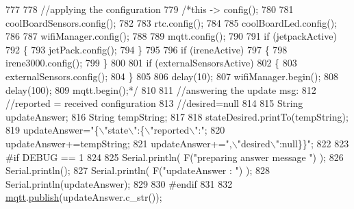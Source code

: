 \begin{DoxyCode}
777 
778             \textcolor{comment}{//applying the configuration    }
779             \textcolor{comment}{/*this -> config();}
780 \textcolor{comment}{}
781 \textcolor{comment}{            coolBoardSensors.config();}
782 \textcolor{comment}{}
783 \textcolor{comment}{            rtc.config();}
784 \textcolor{comment}{}
785 \textcolor{comment}{            coolBoardLed.config();}
786 \textcolor{comment}{            }
787 \textcolor{comment}{            wifiManager.config();}
788 \textcolor{comment}{}
789 \textcolor{comment}{            mqtt.config();}
790 \textcolor{comment}{}
791 \textcolor{comment}{            if (jetpackActive)}
792 \textcolor{comment}{            \{}
793 \textcolor{comment}{                jetPack.config();}
794 \textcolor{comment}{            \}}
795 \textcolor{comment}{}
796 \textcolor{comment}{            if (ireneActive)}
797 \textcolor{comment}{            \{}
798 \textcolor{comment}{                irene3000.config();}
799 \textcolor{comment}{            \}}
800 \textcolor{comment}{}
801 \textcolor{comment}{            if (externalSensorsActive)}
802 \textcolor{comment}{            \{}
803 \textcolor{comment}{                externalSensors.config();}
804 \textcolor{comment}{            \}}
805 \textcolor{comment}{}
806 \textcolor{comment}{            delay(10);}
807 \textcolor{comment}{            wifiManager.begin();}
808 \textcolor{comment}{            delay(100);}
809 \textcolor{comment}{            mqtt.begin();*/}
810 
811                 \textcolor{comment}{//answering the update msg:}
812             \textcolor{comment}{//reported = received configuration}
813             \textcolor{comment}{//desired=null}
814         
815             String updateAnswer;
816             String tempString;
817             
818             stateDesired.printTo(tempString);
819             updateAnswer=\textcolor{stringliteral}{"\{\(\backslash\)"state\(\backslash\)":\{\(\backslash\)"reported\(\backslash\)":"};
820             updateAnswer+=tempString;
821             updateAnswer+=\textcolor{stringliteral}{",\(\backslash\)"desired\(\backslash\)":null\}\}"};
822 
823 \textcolor{preprocessor}{        #if DEBUG == 1}
824 
825             Serial.println( F(\textcolor{stringliteral}{"preparing answer message "}) );
826             Serial.println();
827             Serial.println( F(\textcolor{stringliteral}{"updateAnswer : "}) );
828             Serial.println(updateAnswer);
829         
830 \textcolor{preprocessor}{        #endif  }
831 
832             \hyperlink{classCoolBoard_a2399f44d7c23c1149a335cb3b46d90f1}{mqtt}.\hyperlink{classCoolMQTT_ace977b3e90ab14b1199fe5c4fb0a13ec}{publish}(updateAnswer.c\_str());

\end{DoxyCode}
